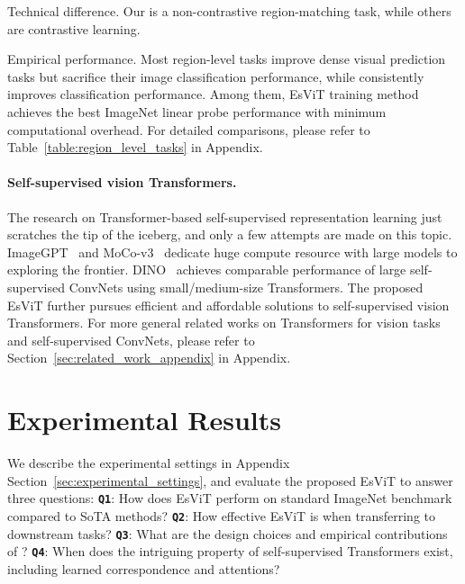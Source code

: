 \documentclass{article} \usepackage{iclr2022_conference,times}
\newcommand{\shortname}{EsViT}
\begin{document}
Technical difference. Our  is a non-contrastive region-matching task, while others are contrastive learning.

Empirical performance. Most region-level tasks improve dense visual prediction tasks but sacrifice their image classification performance, while  consistently improves classification performance. Among them, \shortname{} training method achieves the best ImageNet linear probe performance with minimum computational overhead. For detailed comparisons, please refer to Table~\ref{table:region_level_tasks} in Appendix.


\paragraph{Self-supervised vision Transformers.} The research on Transformer-based self-supervised representation learning just scratches the tip of the iceberg, and only a few attempts are made on this topic.  ImageGPT~\citep{chen2020generative} and MoCo-v3~\citep{chen2021empirical} dedicate huge compute resource with large models to exploring the frontier. 
DINO~\citep{caron2021emerging} achieves comparable performance of large self-supervised ConvNets using small/medium-size Transformers. The proposed \shortname{} further pursues efficient and affordable solutions to self-supervised vision Transformers.
For more general related works on Transformers for vision tasks and self-supervised ConvNets, please refer to Section~\ref{sec:related_work_appendix} in Appendix. 








\vspace{-3mm}
\section{Experimental Results}
\vspace{-3mm}
We describe the experimental settings in Appendix Section~\ref{sec:experimental_settings}, and evaluate the proposed \shortname{}{} to answer three questions:
\textbf{\texttt{Q1}}: How does \shortname{} perform on standard ImageNet benchmark compared to SoTA methods?
\textbf{\texttt{Q2}}: How effective \shortname{} is when transferring to downstream tasks? 
\textbf{\texttt{Q3}}: What are the design choices and empirical contributions of ? 
\textbf{\texttt{Q4}}: When does the intriguing property of self-supervised Transformers exist, including learned correspondence and attentions?
\end{document}
